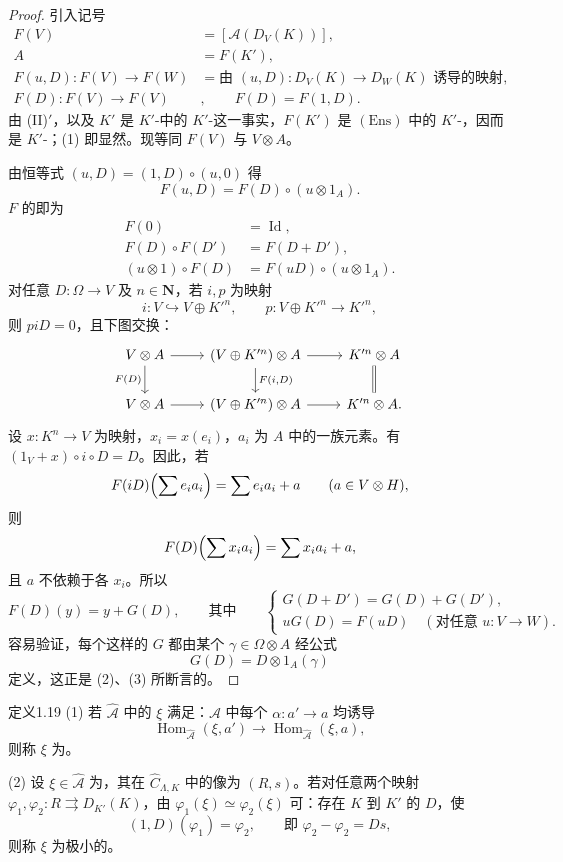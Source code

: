 \begin{proof}
引入记号
\[\begin{aligned}
F(V)&=[\mathcal A(D_V(K))],\\
A&=F(K'),\\
F(u,D):F(V)\to F(W)&=\text{由 }(u,D):D_V(K)\to D_W(K)\text{ 诱导的映射},\\
F(D):F(V)\to F(V)&,\qquad F(D)=F(1,D).
\end{aligned}\]
由 (II)$'$，以及 $K'$ 是 $K'$-中的 $K'$-这一事实，$F(K')$ 是 $(\mathrm{Ens})$ 中的 $K'$-，因而是 $K'$-；(1) 即显然。现等同 $F(V)$ 与 $V\otimes A$。

由恒等式 $(u,D)=(1,D)\circ(u,0)$ 得
\[F(u,D)=F(D)\circ(u\otimes1_A).\]
$F$ 的即为
\[\begin{aligned}
F(0)&=\operatorname{Id},\\
F(D)\circ F(D')&=F(D+D'),\\
(u\otimes1)\circ F(D)&=F(uD)\circ(u\otimes1_A).
\end{aligned}\]
对任意 $D:\Omega\to V$ 及 $n\in\mathbf N$，若 $i,p$ 为映射
\[i:V\hookrightarrow V\oplus K'^n,\qquad p:V\oplus K'^n\longrightarrow K'^n,\]
则 $piD=0$，且下图交换：
\[\begin{tikzcd}
V\otimes A\arrow[r]\arrow[d,"F(D)"']&(V\oplus K'^n)\otimes A\arrow[r]\arrow[d,"{F(i,D)}"]&K'^n\otimes A\arrow[d,equal]\\
V\otimes A\arrow[r]&(V\oplus K'^n)\otimes A\arrow[r]&K'^n\otimes A.
\end{tikzcd}\]
设 $x:K^n\to V$ 为映射，$x_i=x(e_i)$，$a_i$ 为 $A$ 中的一族元素。有 $(1_V+x)\circ i\circ D=D$。因此，若
\[F(iD)\Bigl(\sum e_i a_i\Bigr)=\sum e_i a_i+a\qquad(a\in V\otimes H),\]
则
\[F(D)\Bigl(\sum x_i a_i\Bigr)=\sum x_i a_i+a,\]
且 $a$ 不依赖于各 $x_i$。所以
\[F(D)(y)=y+G(D),\qquad\text{其中}\qquad
\begin{cases}G(D+D')=G(D)+G(D'),\\uG(D)=F(uD)\quad(\text{对任意 }u:V\to W).\end{cases}\]
容易验证，每个这样的 $G$ 都由某个 $\gamma\in\Omega\otimes A$ 经公式
\[G(D)=D\otimes1_A(\gamma)\]
定义，这正是 (2)、(3) 所断言的。
\end{proof}
\begin{SGAresult}{定义}{1.19}
(1) 若 $\widehat{\mathcal A}$ 中的 $\xi$ 满足：$\mathcal A$ 中每个 $\alpha:a'\to a$ 均诱导
\[\operatorname{Hom}_{\widehat{\mathcal A}}(\xi,a')\longrightarrow
\operatorname{Hom}_{\widehat{\mathcal A}}(\xi,a),\]
则称 $\xi$ 为。

(2) 设 $\xi\in\widehat{\mathcal A}$ 为，其在 $\widehat C_{\Lambda,K}$ 中的像为 $(R,s)$。若对任意两个映射 $\varphi_1,\varphi_2:R\rightrightarrows D_{K'}(K)$，由 $\varphi_1(\xi)\simeq\varphi_2(\xi)$ 可：存在 $K$ 到 $K'$ 的 $D$，使
\[(1,D)(\varphi_1)=\varphi_2,\qquad\text{即 }\varphi_2-\varphi_2=Ds,\]
则称 $\xi$ 为极小的。
\end{SGAresult}
